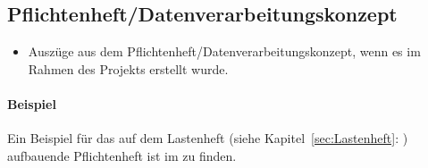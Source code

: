 \subsection{Pflichtenheft/Datenverarbeitungskonzept}
\label{sec:Pflichtenheft}
\begin{itemize}
	\item Auszüge aus dem Pflichtenheft/Datenverarbeitungskonzept, wenn es im Rahmen des Projekts erstellt wurde.
\end{itemize}

\paragraph{Beispiel}
Ein Beispiel für das auf dem Lastenheft (siehe Kapitel~\ref{sec:Lastenheft}: ) aufbauende Pflichtenheft ist im  zu finden.


